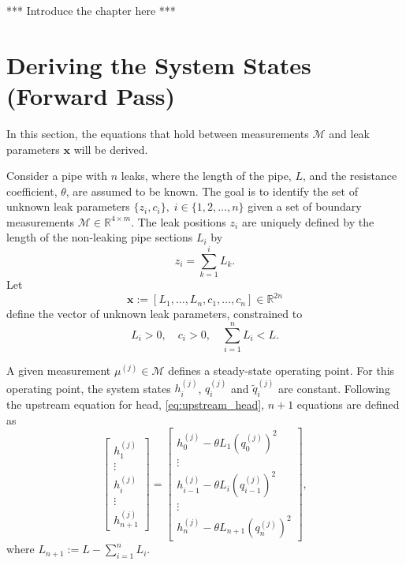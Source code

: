 *** Introduce the chapter here ***

\section{Deriving the System States (Forward Pass)}

In this section, the equations that hold between measurements $\mathcal{M}$ and leak parameters $\mathbf{x}$ will be derived.

Consider a pipe with $n$ leaks, where the length of the pipe, $L$, and the resistance coefficient, $\theta$, are assumed to be known. The goal is to identify the set of unknown leak parameters $\{z_i,c_i\},\;i\in\{1,2,\dots,n\}$ given a set of boundary measurements $\mathcal{M}\in\mathbb{R}^{4 \times m}$. The leak positions $z_i$ are uniquely defined by the length of the non-leaking pipe sections $L_i$ by 
\begin{equation*}
    z_i=\sum_{k=1}^i L_k.
\end{equation*}
Let
\begin{equation*}
    \mathbf{x} := [L_1,\dots,L_n,c_1,\dots,c_n] \in \mathbb{R}^{2n}
\end{equation*}
define the vector of unknown leak parameters, constrained to
\begin{equation}
\label{eq:constraints}
    L_i>0,\quad c_i>0, \quad \sum_{i=1}^n L_i<L.
\end{equation}

A given measurement $\mu^{(j)}\in\mathcal{M}$ defines a steady-state operating point. For this operating point, the system states $h^{(j)}_i$, $q^{(j)}_i$ and $\tilde{q}^{(j)}_i$ are constant. Following the upstream equation for head, \cref{eq:upstream_head}, $n+1$ equations are defined as
\begin{equation}
\label{eq:phi_h}
    \begin{bmatrix}
    h_1^{(j)}\\[0.4em]
    \vdots\\
    h_i^{(j)}\\
    \vdots\\
    h_{n+1}^{(j)}
    \end{bmatrix}
    =
    \begin{bmatrix}
    h_0^{(j)}-\theta L_1 \left(q_0^{(j)}\right)^2\\
    \vdots\\
    h_{i-1}^{(j)}-\theta L_{i} \left(q_{i-1}^{(j)}\right)^2\\
    \vdots\\
    h_{n}^{(j)}-\theta L_{n+1} \left(q_{n}^{(j)}\right)^2
    \end{bmatrix},
\end{equation}
where $L_{n+1}:=L-\sum_{i=1}^n L_i$.

